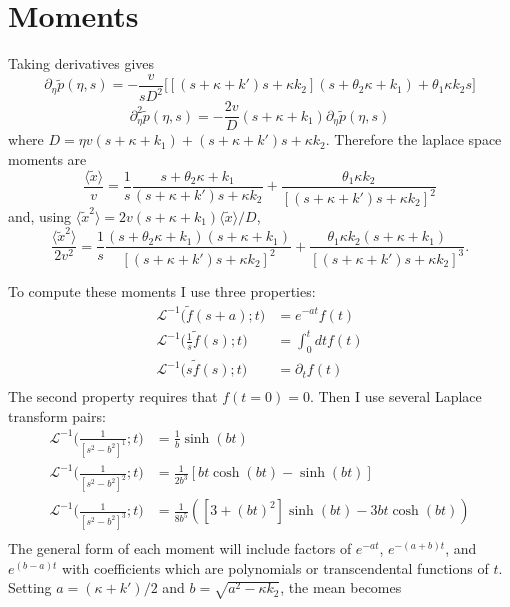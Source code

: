 \documentclass[11pt]{article}
\newcommand\be{\begin{equation}} %
\newcommand\ee{\end{equation}}   %
\newcommand\bra{\langle}
\newcommand\ket{\rangle}
\newcommand\tp{\tilde{p}}
\newcommand\El{\mathcal{L}}
\begin{document}
\section{Moments}

Taking derivatives gives
\be \partial_\eta \tp(\eta,s) = -\frac{v}{sD^2} \Big[[(s+\kappa +k')s+\kappa k_2](s+\theta_2 \kappa + k_1) + \theta_1\kappa k_2 s\Big]\ee
\be \partial_\eta^2 \tp(\eta,s) = -\frac{2v}{D}(s+\kappa + k_1)\partial_\eta \tp(\eta,s)\ee
where $D=\eta v(s+\kappa+k_1)+(s+\kappa+k')s + \kappa k_2.$
Therefore the laplace space moments are
\be \frac{\bra \tilde{x} \ket}{v} = \frac{1}{s}\frac{s+\theta_2\kappa + k_1}{(s+\kappa + k')s + \kappa k_2} + \frac{\theta_1 \kappa k_2}{[(s+\kappa+k')s+\kappa k_2]^2}\ee
and, using $\bra \tilde{x}^2 \ket = 2v(s+\kappa+k_1)\bra \tilde{x}\ket/D$, 
\be \frac{\bra \tilde{x}^2\ket}{2v^2} = \frac{1}{s}\frac{(s+\theta_2 \kappa + k_1)(s+\kappa + k_1)}{[(s+\kappa+k')s+\kappa k_2]^2} + \frac{\theta_1 \kappa k_2(s+\kappa + k_1)}{[(s+\kappa + k')s+\kappa k_2]^3}.\ee

To compute these moments I use three properties:
\begin{align}
\El^{-1}\Big( \tilde{f}(s+a);t \Big)&=e^{-at}f(t)\\
\El^{-1}\Big(\frac{1}{s}\tilde{f}(s);t \Big)&=\int_0^t dt f(t) \\
\El^{-1}\Big(s\tilde{f}(s);t \Big)&=\partial_tf(t) \\
\end{align}
The second property requires that $f(t=0)=0$.
Then I use several Laplace transform pairs:
\begin{align}
\El^{-1}\Big(\frac{1}{[s^2-b^2]^1};t \Big)&= \frac{1}{b}\sinh(bt)\\
\El^{-1}\Big(\frac{1}{[s^2-b^2]^2};t \Big)&= \frac{1}{2b^3}[bt\cosh(bt)-\sinh(bt)]\\
\El^{-1}\Big(\frac{1}{[s^2-b^2]^3};t \Big)&= \frac{1}{8b^5}([3+(bt)^2]\sinh(bt) - 3bt \cosh(bt))\\
\end{align}
The general form of each moment will include factors of $e^{-at}$, $e^{-(a+b)t}$, and $e^{(b-a)t}$ with coefficients which are polynomials or transcendental functions of $t$.
Setting $a = (\kappa+k')/2$ and $b = \sqrt{a^2-\kappa k_2}$, the mean becomes
\be \ee

\end{document}
